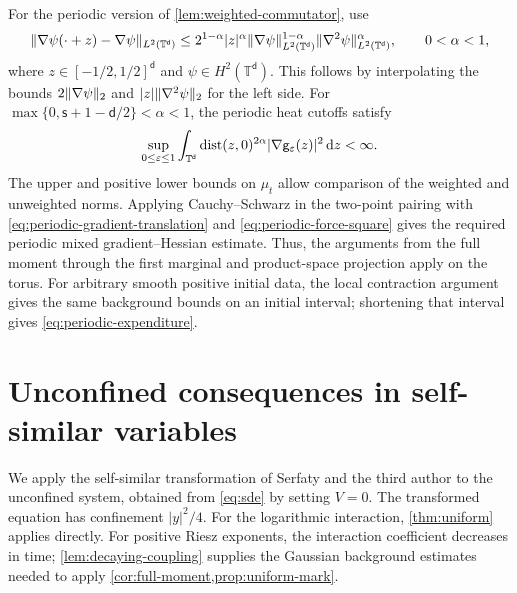\documentclass[11pt,reqno]{amsart}
\numberwithin{equation}{section}
\theoremstyle{plain}
\theoremstyle{remark}
\DeclarePairedDelimiter{\norm}{\lVert}{\rVert}
\renewcommand{\d}{\mathsf{d}}\newcommand{\s}{\mathsf{s}}
\newcommand{\T}{\mathbb T}\newcommand{\R}{\mathbb R}\newcommand{\Z}{\mathbb Z}
\begin{document}
\begin{remark}
For the periodic version of \cref{lem:weighted-commutator}, use
\begin{equation}\label{eq:periodic-gradient-translation}
 \norm{\nabla\psi(\cdot+z)-\nabla\psi}_{L^2(\T^\d)}
 \le 2^{1-\alpha}|z|^\alpha
       \norm{\nabla\psi}_{L^2(\T^\d)}^{1-\alpha}
       \norm{\nabla^2\psi}_{L^2(\T^\d)}^\alpha,
 \qquad 0<\alpha<1,
\end{equation}
where $z\in[-1/2,1/2]^\d$ and $\psi\in H^2(\T^\d)$. This follows by interpolating the bounds $2\norm{\nabla\psi}_2$ and $|z|\norm{\nabla^2\psi}_2$ for the left side. For $\max\{0,\s+1-\d/2\}<\alpha<1$, the periodic heat cutoffs satisfy
\begin{equation}\label{eq:periodic-force-square}
 \sup_{0\le\varepsilon\le1}
 \int_{\T^\d}\operatorname{dist}(z,0)^{2\alpha}
                  |\nabla\g_\varepsilon(z)|^2\dd z<\infty.
\end{equation}
The upper and positive lower bounds on $\mu_t$ allow comparison of the weighted and unweighted norms. Applying Cauchy--Schwarz in the two-point pairing with \eqref{eq:periodic-gradient-translation} and \eqref{eq:periodic-force-square} gives the required periodic mixed gradient--Hessian estimate. Thus, the arguments from the full moment through the first marginal and product-space projection apply on the torus. For arbitrary smooth positive initial data, the local contraction argument gives the same background bounds on an initial interval; shortening that interval gives \eqref{eq:periodic-expenditure}.
\end{remark}

\par\endgroup

\begingroup

\section{Unconfined consequences in self-similar variables}\label{sec:selfsimilar}

We apply the self-similar transformation of Serfaty and the third author \cite[Section~2]{RSselfsimilar} to the unconfined system, obtained from \eqref{eq:sde} by setting $V=0$. The transformed equation has confinement $|y|^2/4$. For the logarithmic interaction, \cref{thm:uniform} applies directly. For positive Riesz exponents, the interaction coefficient decreases in time; \cref{lem:decaying-coupling} supplies the Gaussian background estimates needed to apply \cref{cor:full-moment,prop:uniform-mark}.
\end{document}
